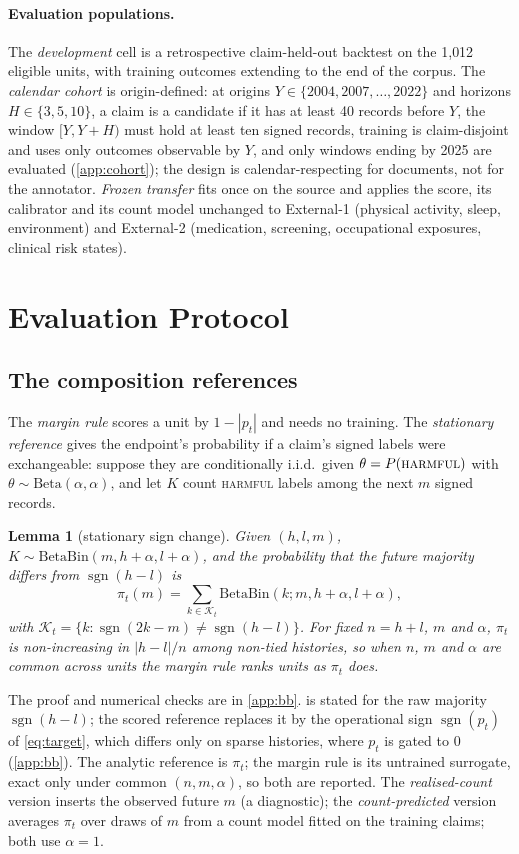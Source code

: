 \documentclass[11pt]{article}
\newtheorem{lemma}{Lemma}
\newcommand{\sgn}{\operatorname{sgn}}
\newcommand{\BB}{\mathrm{BetaBin}}
\begin{document}
\paragraph{Evaluation populations.} The \emph{development} cell is a retrospective claim-held-out
backtest on the 1{,}012 eligible units, with training outcomes extending to the end of the corpus. The \emph{calendar
cohort} is origin-defined: at origins $Y\in\{2004,2007,\ldots,2022\}$ and horizons
$H\in\{3,5,10\}$, a claim is a candidate if it has at least 40 records before $Y$, the window
$[Y,Y+H)$ must hold at least ten signed records, training is claim-disjoint and uses only outcomes
observable by $Y$, and only windows ending by 2025 are evaluated (\cref{app:cohort}); the design is calendar-respecting for documents, not for the annotator.
\emph{Frozen transfer} fits once on the source and applies the score, its calibrator and its count
model unchanged to External-1 (physical activity, sleep, environment) and External-2 (medication,
screening, occupational exposures, clinical risk states).

\section{Evaluation Protocol}
\label{sec:protocol}

\subsection{The composition references}
\label{sec:bb}
The \emph{margin rule} scores a unit by $1-|p_t|$ and needs no training. The \emph{stationary
reference} gives the endpoint's probability if a claim's signed labels were
exchangeable: suppose they are conditionally i.i.d.\ given $\theta=P(\textsc{harmful})$ with
$\theta\sim\mathrm{Beta}(\alpha,\alpha)$, and let $K$ count \textsc{harmful} labels among the next
$m$ signed records.
\begin{lemma}[stationary sign change]
\label{lem:stationary}
Given $(h,l,m)$, $K\sim\BB(m,h+\alpha,l+\alpha)$, and the probability that the future majority
differs from $\sgn(h-l)$ is
\begin{equation}
\pi_t(m)=\sum_{k\in\mathcal{K}_t}\BB(k;m,h{+}\alpha,l{+}\alpha),
\label{eq:bb}
\end{equation}
with $\mathcal{K}_t=\{k:\sgn(2k-m)\neq\sgn(h-l)\}$.
For fixed $n=h+l$, $m$ and $\alpha$, $\pi_t$ is non-increasing in $|h-l|/n$ among non-tied
histories, so when $n$, $m$ and $\alpha$ are common across units the margin rule ranks units as
$\pi_t$ does.
\end{lemma}
The proof and numerical checks are in \cref{app:bb}.  is stated for the raw majority
$\sgn(h-l)$; the scored reference replaces it by the operational sign $\sgn(p_t)$ of
\cref{eq:target}, which differs only on sparse histories, where $p_t$ is gated to 0
(\cref{app:bb}). The analytic reference is $\pi_t$; the margin rule is its untrained surrogate,
exact only under common $(n,m,\alpha)$, so both are reported. The \emph{realised-count} version
inserts the observed future $m$ (a diagnostic); the \emph{count-predicted} version averages
$\pi_t$ over draws of $m$ from a count model fitted on the training claims; both use $\alpha=1$.
\end{document}
